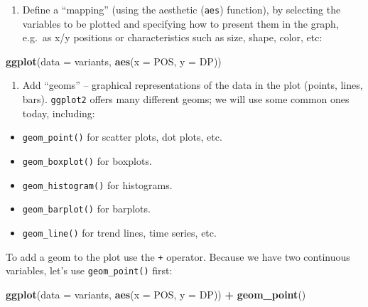 \documentclass[
]{book}
\newenvironment{Shaded}{\begin{snugshade}}{\end{snugshade}}
\newcommand{\AttributeTok}[1]{\textcolor[rgb]{0.13,0.29,0.53}{#1}}
\newcommand{\FunctionTok}[1]{\textcolor[rgb]{0.13,0.29,0.53}{\textbf{#1}}}
\newcommand{\NormalTok}[1]{#1}
\newcommand{\SpecialCharTok}[1]{\textcolor[rgb]{0.81,0.36,0.00}{\textbf{#1}}}
\providecommand{\tightlist}{%
  \setlength{\itemsep}{0pt}\setlength{\parskip}{0pt}}
\begin{document}
\begin{enumerate}
\def\labelenumi{\arabic{enumi}.}
\setcounter{enumi}{1}
\tightlist
\item
  Define a ``mapping'' (using the aesthetic (\texttt{aes}) function), by selecting the variables to be plotted and specifying how to present them in the graph, e.g.~as x/y positions or characteristics such as size, shape, color, etc:
\end{enumerate}

\begin{Shaded}
\begin{Highlighting}[]
\FunctionTok{ggplot}\NormalTok{(}\AttributeTok{data =}\NormalTok{ variants, }\FunctionTok{aes}\NormalTok{(}\AttributeTok{x =}\NormalTok{ POS, }\AttributeTok{y =}\NormalTok{ DP))}
\end{Highlighting}
\end{Shaded}

\begin{enumerate}
\def\labelenumi{\arabic{enumi}.}
\setcounter{enumi}{2}
\tightlist
\item
  Add ``geoms'' -- graphical representations of the data in the plot (points, lines, bars). \texttt{ggplot2} offers many different geoms; we will use some common ones today, including:
\end{enumerate}

\begin{itemize}
\tightlist
\item
  \texttt{geom\_point()} for scatter plots, dot plots, etc.
\item
  \texttt{geom\_boxplot()} for boxplots.
\item
  \texttt{geom\_histogram()} for histograms.
\item
  \texttt{geom\_barplot()} for barplots.
\item
  \texttt{geom\_line()} for trend lines, time series, etc.
\end{itemize}

To add a geom to the plot use the \texttt{+} operator. Because we have two continuous variables, let's use \texttt{geom\_point()} first:

\begin{Shaded}
\begin{Highlighting}[]
\FunctionTok{ggplot}\NormalTok{(}\AttributeTok{data =}\NormalTok{ variants, }\FunctionTok{aes}\NormalTok{(}\AttributeTok{x =}\NormalTok{ POS, }\AttributeTok{y =}\NormalTok{ DP)) }\SpecialCharTok{+}
  \FunctionTok{geom\_point}\NormalTok{()}
\end{Highlighting}
\end{Shaded}
\end{document}
